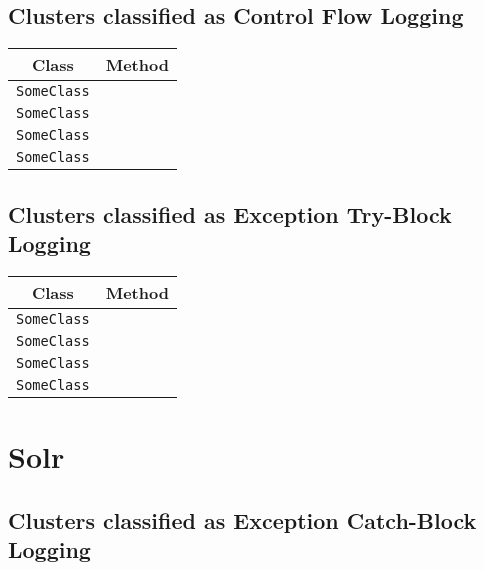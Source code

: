 \subsection{Clusters classified as Control Flow Logging}

\begin{center}
\begin{tabular}{ll}\toprule
\multicolumn{1}{c}{Class}&\multicolumn{1}{c}{Method}\\\midrule
\lstinline/SomeClass/&\raisebox{0pt}{\lstinline/foo(int)/}\\
\lstinline/SomeClass/&\raisebox{0pt}{\lstinline/foo(int)/}\\
\lstinline/SomeClass/&\raisebox{0pt}{\lstinline/foo(int)/}\\
\lstinline/SomeClass/&\raisebox{0pt}{\lstinline/foo(int)/}\\
\bottomrule
\end{tabular}
\end{center}

\subsection{Clusters classified as Exception Try-Block Logging}

\begin{center}
\begin{tabular}{ll}\toprule
\multicolumn{1}{c}{Class}&\multicolumn{1}{c}{Method}\\\midrule
\lstinline/SomeClass/&\raisebox{0pt}{\lstinline/foo(int)/}\\
\lstinline/SomeClass/&\raisebox{0pt}{\lstinline/foo(int)/}\\
\lstinline/SomeClass/&\raisebox{0pt}{\lstinline/foo(int)/}\\
\lstinline/SomeClass/&\raisebox{0pt}{\lstinline/foo(int)/}\\
\bottomrule
\end{tabular}
\end{center}

\section{Solr}\label{solr}

\subsection{Clusters classified as Exception Catch-Block Logging}

